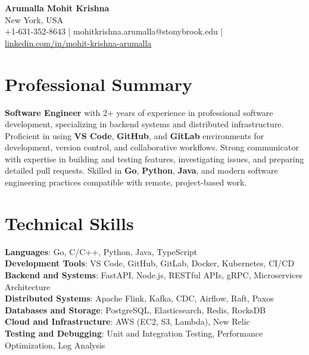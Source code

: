 \documentclass[letterpaper,11pt]{article}
\begin{document}
\begin{center}
  {\Large \textbf{Arumalla Mohit Krishna}} \\
  New York, USA \\
  +1-631-352-8643 \enspace | \enspace mohitkrishna.arumalla@stonybrook.edu \enspace | \enspace \href{https://www.linkedin.com/in/mohit-krishna-arumalla}{linkedin.com/in/mohit-krishna-arumalla}
\end{center}

\section{Professional Summary}
  \begin{itemize}[leftmargin=0.15in, label={}]
    \small{\item{
     \textbf{Software Engineer} with 2+ years of experience in professional software development, specializing in backend systems and distributed infrastructure. Proficient in using \textbf{VS Code}, \textbf{GitHub}, and \textbf{GitLab} environments for development, version control, and collaborative workflows. Strong communicator with expertise in building and testing features, investigating issues, and preparing detailed pull requests. Skilled in \textbf{Go}, \textbf{Python}, \textbf{Java}, and modern software engineering practices compatible with remote, project-based work.
    }}
  \end{itemize}
\vspace{-16pt}

\section{Technical Skills}
 \begin{itemize}[leftmargin=0.15in, label={}]
    \small{\item{
     \textbf{Languages}: Go, C/C++, Python, Java, TypeScript \\
     \textbf{Development Tools}: VS Code, GitHub, GitLab, Docker, Kubernetes, CI/CD \\
     \textbf{Backend and Systems}: FastAPI, Node.js, RESTful APIs, gRPC, Microservices Architecture \\
     \textbf{Distributed Systems}: Apache Flink, Kafka, CDC, Airflow, Raft, Paxos \\
     \textbf{Databases and Storage}: PostgreSQL, Elasticsearch, Redis, RocksDB \\
     \textbf{Cloud and Infrastructure}: AWS (EC2, S3, Lambda), New Relic \\
     \textbf{Testing and Debugging}: Unit and Integration Testing, Performance Optimization, Log Analysis
    }}
 \end{itemize}
\vspace{-16pt}
\end{document}
